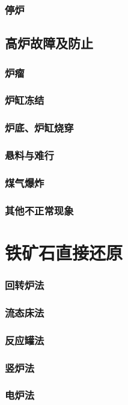 \documentclass[UTF8]{../../ApplicationUniverse}
\begin{document}
        \subsubsection{停炉}
    \subsection{高炉故障及防止}
        \subsubsection{炉瘤}
        \subsubsection{炉缸冻结}
        \subsubsection{炉底、炉缸烧穿}
        \subsubsection{悬料与难行}
        \subsubsection{煤气爆炸}
        \subsubsection{其他不正常现象}
\section{铁矿石直接还原}
    \subsubsection{回转炉法}
    \subsubsection{流态床法}
    \subsubsection{反应罐法}
    \subsubsection{竖炉法}
    \subsubsection{电炉法}
\end{document}
